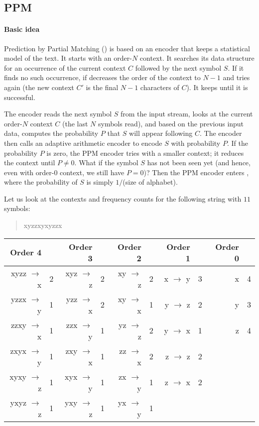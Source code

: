 \documentclass[a4paper, 11pt, openany]{book}
\begin{document}
\subsection{PPM}

\paragraph{Basic idea} Prediction by Partial Matching () is based on an encoder that keeps a statistical model of the text. It starts with an order-$N$ context. It searches its data structure for an occurrence of the current context $C$ followed by the next symbol $S$. If it finds no such occurrence, if decreases the order of the context to $N-1$ and tries again (the new context $C'$ is the final $N-1$ characters of $C$). It keeps  until it is successful.

The encoder reads the next symbol $S$ from the input stream, looks at the current order-$N$ context $C$ (the last $N$ symbols read), and based on the previous input data, computes the probability $P$ that $S$ will appear following $C$. The encoder then calls an adaptive arithmetic encoder to encode $S$ with probability $P$. If the probability $P$ is zero, the PPM encoder tries with a smaller context; it reduces the context until $P \ne 0$. What if the symbol $S$ has not been seen yet (and hence, even with order-$0$ context, we still have $P = 0$)? Then the PPM encoder enters , where the probability of $S$ is simply $1/$(size of alphabet).

\begin{example} \label{example:ppm_contexts}
Let us look at the contexts and frequency counts for the following string with $11$ symbols:
\begin{quote}
    xyzzxyxyzzx
\end{quote}

\begin{tabular}{r l | r l | r l | r l | r l}
    Order 4 & & Order 3 & & Order 2 & & Order 1 & & Order 0 &   \\
    \hline
    xyzz $\to$ x & 2 & xyz $\to$ z & 2 & xy $\to$ z & 2 & x $\to$ y & 3 & x & 4\\
    yzzx $\to$ y & 1 & yzz $\to$ x & 2 & xy $\to$ x & 1 & y $\to$ z & 2 & y & 3\\
    zzxy $\to$ x & 1 & zzx $\to$ y & 1 & yz $\to$ z & 2 & y $\to$ x & 1 & z & 4\\
    zxyx $\to$ y & 1 & zxy $\to$ x & 1 & zz $\to$ x & 2 & z $\to$ z & 2 &  & \\
    xyxy $\to$ z & 1 & xyx $\to$ y & 1 & zx $\to$ y & 1 & z $\to$ x & 2 &  & \\
    yxyz $\to$ z & 1 & yxy $\to$ z & 1 & yx $\to$ y & 1 & & &  &
\end{tabular}
\end{example}
\end{document}
